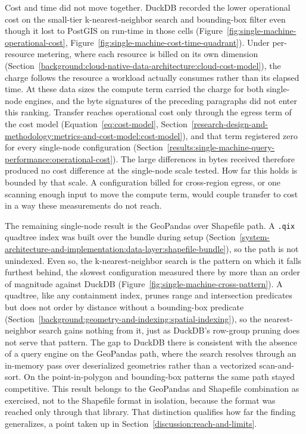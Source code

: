 Cost and time did not move together. DuckDB recorded the lower operational cost on the small-tier k-nearest-neighbor search and bounding-box filter even though it lost to PostGIS on run-time in those cells (Figure~\ref{fig:single-machine-operational-cost}, Figure~\ref{fig:single-machine-cost-time-quadrant}). Under per-resource metering, where each resource is billed on its own dimension \parencite{mell2011_nist_definition_of_cloud_computing} (Section~\ref{background:cloud-native-data-architecture:cloud-cost-model}), the charge follows the resource a workload actually consumes rather than its elapsed time. At these data sizes the compute term carried the charge for both single-node engines, and the byte signatures of the preceding paragraphs did not enter this ranking. Transfer reaches operational cost only through the egress term of the cost model (Equation~\ref{eq:cost-model}, Section~\ref{research-design-and-methodology:metrics-and-cost-model:cost-model}), and that term registered zero for every single-node configuration (Section~\ref{results:single-machine-query-performance:operational-cost}). The large differences in bytes received therefore produced no cost difference at the single-node scale tested. How far this holds is bounded by that scale. A configuration billed for cross-region egress, or one scanning enough input to move the compute term, would couple transfer to cost in a way these measurements do not reach.

The remaining single-node result is the GeoPandas over Shapefile path. A \texttt{.qix} quadtree index was built over the bundle during setup (Section~\ref{system-architecture-and-implementation:data-layer:shapefile-bundle}), so the path is not unindexed. Even so, the k-nearest-neighbor search is the pattern on which it falls furthest behind, the slowest configuration measured there by more than an order of magnitude against DuckDB (Figure~\ref{fig:single-machine-cross-pattern}). A quadtree, like any containment index, prunes range and intersection predicates but does not order by distance without a bounding-box predicate \parencite{guttman1984_rtree_dynamic_index} (Section~\ref{background:geometry-and-indexing:spatial-indexing}), so the nearest-neighbor search gains nothing from it, just as DuckDB's row-group pruning does not serve that pattern. The gap to DuckDB there is consistent with the absence of a query engine on the GeoPandas path, where the search resolves through an in-memory pass over deserialized geometries rather than a vectorized scan-and-sort. On the point-in-polygon and bounding-box patterns the same path stayed competitive. This result belongs to the GeoPandas and Shapefile combination as exercised, not to the Shapefile format in isolation, because the format was reached only through that library. That distinction qualifies how far the finding generalizes, a point taken up in Section~\ref{discussion:reach-and-limits}.